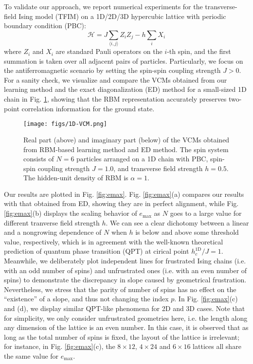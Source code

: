 \documentclass[aps,prl,reprint,superscriptaddress]{revtex4-2}
\begin{document}
To validate our approach, we report numerical experiments for the transverse-field Ising model (TFIM) on a 1D/2D/3D hypercubic lattice with periodic boundary condition (PBC):
\begin{equation}
	\mathcal{H} = J \sum\limits_{\langle i,j \rangle} Z_i Z_j - h \sum\limits_{i} X_i
\end{equation}
where $ Z_i $ and $ X_i $ are standard Pauli operators on the $ i $-th spin, and the first summation is taken over all adjacent pairs of particles. Particularly, we focus on the antiferromagnetic scenario by setting the spin-spin coupling strength $ J > 0 $. For a sanity check, we visualize and compare the VCMs obtained from our learning method and the exact diagonalization (ED) method for a small-sized 1D chain in Fig. \ref{fig:VCM}, showing that the RBM representation accurately preserves two-point correlation information for the ground state.

\begin{figure}
	\hspace*{-0.48\textwidth}
	\texttt{[image: figs/1D-VCM.png]}%
	\caption{Real part (above) and imaginary part (below) of the VCMs obtained from RBM-based learning method and ED method. The spin system consists of $ N = 6 $ particles arranged on a 1D chain with PBC, spin-spin coupling strength $ J = 1.0 $, and transverse field strength $ h = 0.5 $. The hidden-unit density of RBM is $ \alpha = 1 $.}
	\label{fig:VCM}
\end{figure}

Our results are plotted in Fig. \ref{fig:emax}. Fig. \ref{fig:emax}(a) compares our results with that obtained from ED, showing they are in perfect alignment, while Fig. \ref{fig:emax}(b) displays the scaling behavior of $ e_{\max} $ as $ N $ goes to a large value for different tranverse field strength $ h $. We can see a clear dichotomy between a linear and a nongrowing dependence of $ N $ when $ h $ is below and above some threshold value, respectively, which is in agreement with the well-known theoretical prediction of quantum phase transition (QPT) at cirical point $ h_c^{\text{1D}}/J = 1 $. Meanwhile, we deliberately plot independent lines for frustrated Ising chains (i.e. with an odd number of spins) and unfrustrated ones (i.e. with an even number of spins) to demonstrate the discrepancy in slope caused by geometrical frustration. Nevertheless, we stress that the parity of number of spins has no effect on the ``existence'' of a slope, and thus not changing the index $ p $. In Fig. \ref{fig:emax}(c) and (d), we display similar QPT-like phenomena for 2D and 3D cases. Note that for simplicity, we only consider unfrustrated geometries here, i.e. the length along any dimension of the lattice is an even number. In this case, it is observed that as long as the total number of spins is fixed, the layout of the lattice is irrelevant; for instance, in Fig. \ref{fig:emax}(c), the $ 8 \times 12 $, $ 4 \times 24 $ and $ 6 \times 16 $ lattices all share the same value for $ e_{\max} $.
\end{document}
